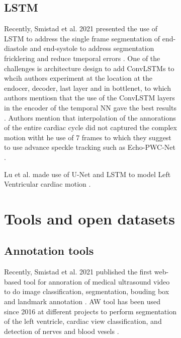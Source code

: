 \begin{figure}[H]
\begin{figure}[H]




\subsection{LSTM}
Recently, Smistad et al. 2021 presented the use of LSTM to address the single frame segmentation of end-diastole and end-systole to address segmentation fricklering and reduce tmeporal errors \cite{smistad2021-C-IUS}.
One of the challenges is architecture design to add ConvLSTMs to whcih authors experiment at the location at the endocer, decoder, last layer and in bottlenet, to which authors mentiosn that the use of the ConvLSTM layers in the encoder of the temporal NN gave the best results \cite{smistad2021-C-IUS}.
Authors mention that interpolation of the annorations of the entire cardiac cycle did not captured the complex motion witht he use of 7 frames to which they suggest to use advance speckle tracking such as Echo-PWC-Net  \cite{ostvik2021-TMI}.

Lu et al. made use of U-Net and LSTM to model Left Ventricular cardiac motion \cite{lu2020-MIUA}.




\section{Tools and open datasets}

\subsection{Annotation tools}
Recently, Smistad et al. 2021 published the first web-based tool for annoration of medical ultrasound video to do image classification, segmentation, bouding box and landmark annotation  \cite{smistad2021-A-IUS}. 
AW tool has been used since 2016 at different projects to perform segmentation of the left ventricle, cardiac view classification, and detection of nerves and blood vesels
\cite{smistad2021-A-IUS}.


\end{figure}
\end{figure}
